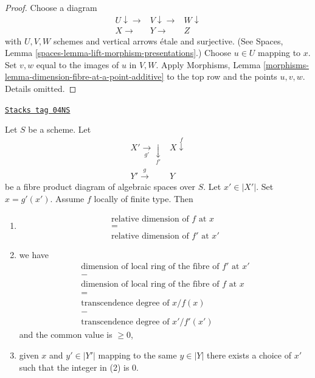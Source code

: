 \begin{proof}
Choose a diagram
$$
\begin{array}{ccc}U \downarrow\longrightarrow & V \downarrow\longrightarrow & W \downarrow \\ X \longrightarrow & Y \longrightarrow & Z\end{array}
$$
with $U, V, W$ schemes and vertical arrows \'etale and surjective. (See
Spaces, Lemma \ref{spaces-lemma-lift-morphism-presentations}.)
Choose $u \in U$ mapping to $x$. Set $v, w$ equal to the images
of $u$ in $V, W$.
Apply
Morphisms, Lemma \ref{morphisms-lemma-dimension-fibre-at-a-point-additive}
to the top row and the points $u, v, w$. Details omitted.
\end{proof}

\begin{lemma}
\label{spaces-morphisms-lemma-dimension-fibre-after-base-change}
\href{https://stacks.math.columbia.edu/tag/04NS}{\texttt{Stacks tag 04NS}}

Let $S$ be a scheme. Let
$$
\begin{array}{cc}X' \underset{g'}{\longrightarrow}\underset{f'}{\downarrow} & X \overset{f}{\downarrow} \\ Y' \overset{g}{\longrightarrow} & Y\end{array}
$$
be a fibre product diagram of algebraic spaces over $S$.
Let $x' \in |X'|$. Set $x = g'(x')$. Assume $f$ locally of finite type.
Then
\begin{enumerate}
\item
$$
\begin{matrix}
\text{relative dimension of }f\text{ at }x \\
= \\
\text{relative dimension of }f'\text{ at }x'
\end{matrix}
$$
\item we have
$$
\begin{matrix}
\text{dimension of local ring of the fibre of }f'\text{ at }x' \\
- \\
\text{dimension of local ring of the fibre of }f\text{ at }x \\
= \\
\text{transcendence degree of }x/f(x) \\
- \\
\text{transcendence degree of }x'/f'(x')
\end{matrix}
$$
and the common value is $\geq 0$,
\item given $x$ and $y' \in |Y'|$ mapping to the same $y \in |Y|$
there exists a choice of $x'$ such that the integer in (2) is $0$.
\end{enumerate}
\end{lemma}

